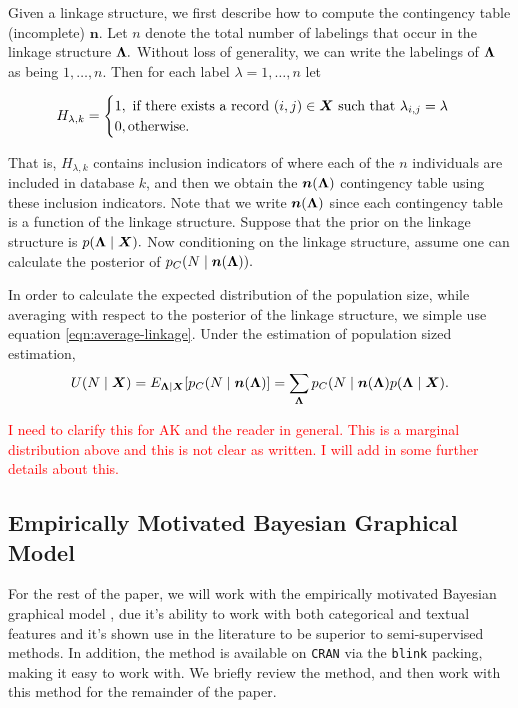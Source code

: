 \documentclass[twoside]{article}
\newcommand{\n}{\boldsymbol{n}}
\newcommand{\bn}{\boldsymbol{n}}
\begin{document}
Given a linkage structure, we first describe how to compute the contingency table (incomplete) $\n.$ Let $n$ denote the total number of labelings that occur in the linkage structure $\boldsymbol{\Lambda}.$ Without loss of generality, we can write the labelings of $\boldsymbol{\Lambda}$ as being $1,\ldots,n.$ Then for each label
$\lambda = 1,\ldots,n$ let 

$$
H_{\lambda,k} =
\begin{cases}
1, \text{ if there exists a record $(i,j) \in \bm{X}$ such that $\lambda_{i,j} = \lambda$} \\
0, \text{otherwise}. \\
\end{cases}
$$

That is, $H_{\lambda,k}$ contains inclusion indicators of where each of the $n$ individuals are included in database $k$, and then we obtain the $\n(\lam)$ contingency table using these inclusion indicators. Note that we write $\n(\lam)$ since each contingency table is a function of the linkage structure. Suppose that the prior on the linkage structure is  $p(\boldsymbol{\Lambda} \mid \bm{X}).$ Now conditioning on the linkage structure, assume one can calculate the posterior of $p_C(N \mid \bn(\lam)).$

In order to calculate the expected distribution of the population size, while averaging with respect to the posterior of the linkage structure, we simple use equation \ref{eqn:average-linkage}. Under the estimation of population sized estimation, 
$$U(N \mid \bX) = E_{\lam \mid \bX} [p_C(N \mid \bn(\lam)] = \sum_{\lam} p_C(N \mid \bn(\lam) p(\lam \mid \bX).$$





\textcolor{red}{I need to clarify this for AK and the reader in general. This is a marginal distribution above and this is not clear as written. I will add in some further details about this.}

\subsection{Empirically Motivated Bayesian Graphical Model}
\label{sec:eblink}
For the rest of the paper, we will work with the empirically motivated Bayesian graphical model \cite{steorts15entity} , due it's ability to work
with both categorical and textual features and it's shown use in the literature to be superior to semi-supervised methods. In addition, the method
is available on \texttt{CRAN} via the \texttt{blink} packing, making it easy to work with. We briefly review the method, and then work with this method for the remainder of the paper. 
\end{document}
